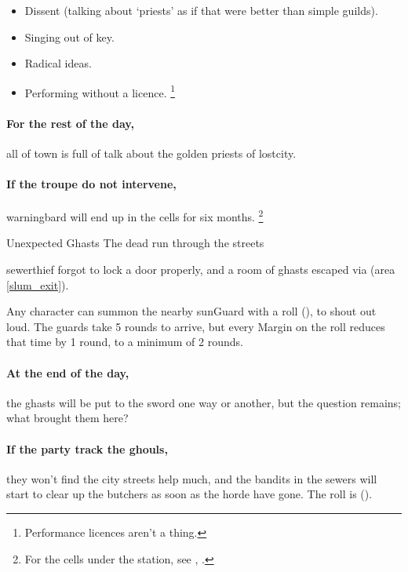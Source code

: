 \begin{itemize}
  \item
  Dissent (talking about `priests' as if that were better than simple guilds).
  \item
  Singing out of key.
  \item
  Radical ideas.
  \item
  Performing without a licence.%
  \footnote{Performance licences aren't a thing.}
\end{itemize}

\paragraph{For the rest of the day,}
all of \gls{town} is full of talk about the golden priests of \gls{lostcity}.

\paragraph{If the troupe do not intervene,}
\gls{warningbard} will end up in the cells for six months.
\footnote{For the cells under the  station, see , .}

\warningbard

{Unexpected Ghasts}%
{The dead run through the streets}%

\Gls{sewerthief} forgot to lock a door properly, and a room of ghasts escaped via  (area \vref{slum_exit}).




Any character can summon the nearby \gls{sunGuard} with a  roll (\tn[7]), to shout out loud.
The guards take 5 rounds to arrive, but every Margin on the roll reduces that time by 1 round, to a minimum of 2 rounds.

\paragraph{At the end of the day,}
the ghasts will be put to the sword one way or another, but the question remains; what brought them here?

\paragraph{If the party track the ghouls,}
they won't find the city streets help much, and the bandits in the sewers will start to clear up the butchers as soon as the horde have gone.
The roll is  (\tn[14]).

